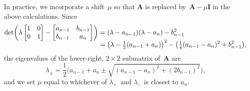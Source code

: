 \documentclass[12pt,a4paper]{article}
\newcommand{\bs}[1]{\boldsymbol{#1}}
\begin{document}
In practice, we incorporate a shift~$\mu$ so that $\bs{A}$ is replaced
by~$\bs{A}-\mu\bs{I}$ in the above calculations.  Since
\begin{align*}
\smash[b]{\det\biggl(\lambda\begin{bmatrix}1&0\\ 0&1\end{bmatrix}
    -\begin{bmatrix}a_{n-1}&b_{n-1}\\ b_{n-1}&a_n \end{bmatrix}\biggr)}
&=(\lambda-a_{n-1})(\lambda-a_n)-b_{n-1}^2\\
&=\bigl(\lambda-\tfrac12(a_{n-1}+a_n)\bigr)^2
    -\bigl(\tfrac14(a_{n-1}-a_n)^2+b_{n-1}^2\bigr),
\end{align*}
the eigenvalues of the lower-right, $2\times2$ submatrix of~$\bs{A}$ are
\begin{equation}\label{eq: 2x2 eigs}
\lambda_\pm=\frac{1}{2}\bigl(a_{n-1}+a_n\pm\sqrt{(a_{n-1}-a_n)^2+(2b_{n-1})^2}
\bigr),
\end{equation}
and we set $\mu$ equal to whichever of $\lambda_+$~and $\lambda_-$ is closest
to $a_n$.










\end{document}
